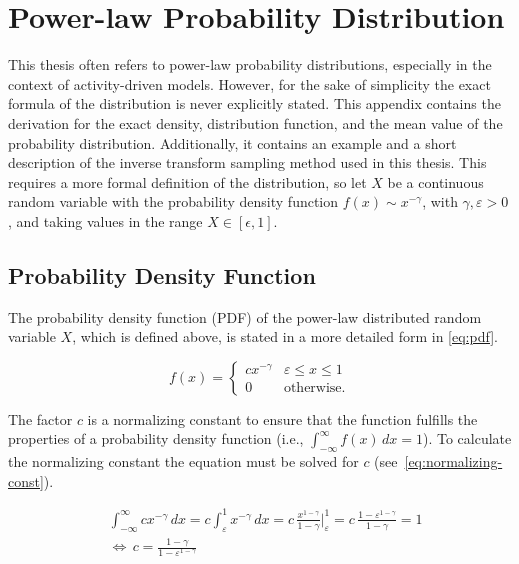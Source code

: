 \chapter{Power-law Probability Distribution}


This thesis often refers to power-law probability distributions, especially in the context of activity-driven models.
However, for the sake of simplicity the exact formula of the distribution is never explicitly stated.
This appendix contains the derivation for the exact density, distribution function, and the mean value of the probability distribution.
Additionally, it contains an example and a short description of the inverse transform sampling method used in this thesis.
This requires a more formal definition of the distribution, so let \(X\) be a continuous random variable with the probability density function \(f(x) \sim x^{-\gamma}\), with \(\gamma, \varepsilon > 0\), and taking values in the range \(X \in [\epsilon, 1]\).




\section{Probability Density Function}
\label{sec:pdf}

The probability density function (PDF) of the power-law distributed random variable \(X\), which is defined above, is stated in a more detailed form in \autoref{eq:pdf}.

\begin{equation}
	f(x) =
	\begin{cases}
		c x^{-\gamma} & \varepsilon \leq x \leq 1 \\
		0             & \text{otherwise.}
	\end{cases}
	\label{eq:pdf}
\end{equation}

The factor \(c\) is a normalizing constant to ensure that the function fulfills the properties of a probability density function (i.e., \(\int_{-\infty}^{\infty} f(x) \, dx = 1\)).
To calculate the normalizing constant the equation must be solved for \(c\) (see~\autoref{eq:normalizing-const}).

\begin{align}
	& \int_{-\infty}^{\infty} cx^{-\gamma} \, dx = c \int_{\varepsilon}^{1} x^{-\gamma} \, dx = c \, \frac{x^{1-\gamma}}{1-\gamma}  \bigg |_{\varepsilon}^{1} = c \, \frac{1 - \varepsilon^{1-\gamma}}{1-\gamma} = 1 \\
	& \Leftrightarrow \, c = \frac{1-\gamma}{1 - \varepsilon^{1-\gamma}}
	\label{eq:normalizing-const}
\end{align}


